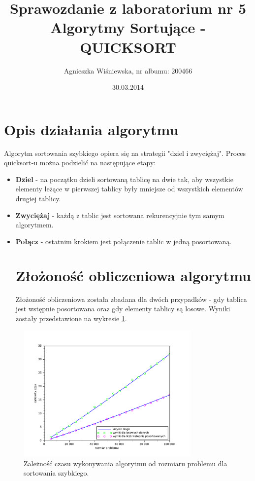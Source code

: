 \documentclass{mwart}
\title{\Huge{Sprawozdanie z laboratorium nr 5 \\
Algorytmy Sortujące -QUICKSORT }}
\author{Agnieszka Wiśniewska, nr albumu: 200466}
\date{30.03.2014}
\begin{document}
\maketitle

\section{Opis działania algorytmu}
Algorytm sortowania szybkiego opiera się na strategii "dziel i zwyciężaj". Proces quicksort-u można podzielić na następujące etapy:
\begin{itemize}
\item{\textbf{Dziel}
- na początku dzieli sortowaną tablicę na dwie tak, aby wszystkie elementy leżące w pierwszej tablicy były mniejsze od wszystkich elementów drugiej tablicy.}
\item{\textbf{Zwyciężaj}
- każdą z tablic jest sortowana rekurencyjnie tym samym algorytmem.}
\item{\textbf{Połącz}
- ostatnim krokiem jest połączenie tablic w jedną posortowaną.}
\section{Złożoność obliczeniowa algorytmu}
Złożoność obliczeniowa została zbadana dla dwóch przypadków - gdy tablica jest wstępnie posortowana oraz gdy elementy tablicy są losowe.
Wyniki zostały przedstawione na wykresie \ref{trend}.
\end{itemize}

\begin{figure}[!htp]
\centering
\includegraphics[width=0.8\textwidth]{files/trend.pdf}
\caption{Zależność czasu wykonywania algorytmu od rozmiaru problemu dla sortowania szybkiego.\label{trend}} 
\end{figure}
\newpage
\end{document}
